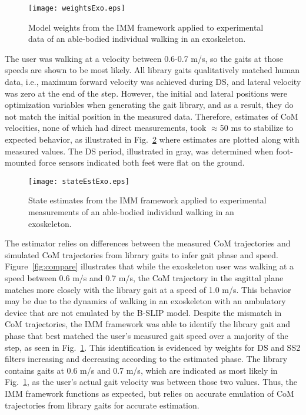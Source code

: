 \begin{figure}
	\centering
	\texttt{[image: weightsExo.eps]}
	\caption{Model weights from the IMM framework applied to experimental data of an able-bodied individual walking in an exoskeleton.}\label{fig:exoWeights}
\end{figure}

The user was walking at a velocity between 0.6-0.7 m/s, so the gaits at those speeds are shown to be most likely. All library gaits qualitatively matched human data, i.e., maximum forward velocity was achieved during DS, and lateral velocity was zero at the end of the step. However, the initial and lateral positions were optimization variables when generating the gait library, and as a result, they do not match the initial position in the measured data. Therefore, estimates of CoM velocities, none of which had direct measurements, took $ \approx $50 ms to stabilize to expected behavior, as illustrated in Fig.~\ref{fig:exoState} where estimates are plotted along with measured values. The DS period, illustrated in gray, was determined when foot-mounted force sensors indicated both feet were flat on the ground.
\begin{figure}
	\centering
	\texttt{[image: stateEstExo.eps]}
	\caption{State estimates from the IMM framework applied to experimental measurements of an able-bodied individual walking in an exoskeleton.}\label{fig:exoState}
\end{figure}

The estimator relies on differences between the measured CoM trajectories and simulated CoM trajectories from library gaits to infer gait phase and speed. Figure~\ref{fig:compare} illustrates that while the exoskeleton user was walking at a speed between 0.6 m/s and 0.7 m/s, the CoM trajectory in the sagittal plane matches more closely with the library gait at a speed of 1.0 m/s. This behavior may be due to the dynamics of walking in an exoskeleton with an ambulatory device that are not emulated by the B-SLIP model. Despite the mismatch in CoM trajectories, the IMM framework was able to identify the library gait and phase that best matched the user's measured gait speed over a majority of the step, as seen in Fig.~\ref{fig:exoWeights}. This identification is evidenced by weights for DS and SS2 filters increasing and decreasing according to the estimated phase. The library contains gaits at 0.6 m/s and 0.7 m/s, which are indicated as most likely in Fig.~\ref{fig:exoWeights}, as the user's actual gait velocity was between those two values. Thus, the IMM framework functions as expected, but relies on accurate emulation of CoM trajectories from library gaits for accurate estimation.


